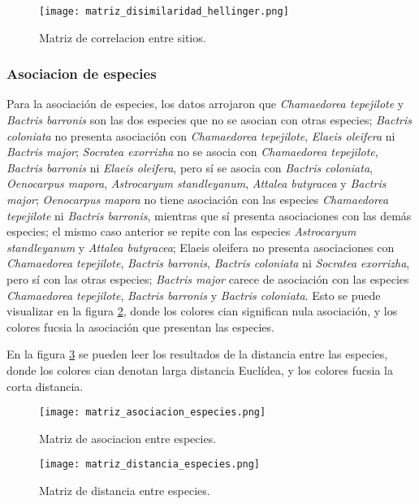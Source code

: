 \documentclass[11pt,]{article}
\begin{document}
\begin{figure}
\centering
\texttt{[image: matriz\_disimilaridad\_hellinger.png]}
\caption{Matriz de correlacion entre sitios.
\label{fig:matriz_disimilaridad_hellinger}}
\end{figure}

\subsubsection{Asociacion de especies}\label{asociacion-de-especies}

Para la asociación de especies, los datos arrojaron que
\emph{Chamaedorea tepejilote} y \emph{Bactris barronis} son las dos
especies que no se asocian con otras especies; \emph{Bactris coloniata}
no presenta asociación con \emph{Chamaedorea tepejilote}, \emph{Elaeis
oleifera} ni \emph{Bactris major}; \emph{Socratea exorrizha} no se
asocia con \emph{Chamaedorea tepejilote}, \emph{Bactris barronis} ni
\emph{Elaeis oleifera}, pero sí se asocia con \emph{Bactris coloniata},
\emph{Oenocarpus mapora}, \emph{Astrocaryum standleyanum}, \emph{Attalea
butyracea} y \emph{Bactris major}; \emph{Oenocarpus mapora} no tiene
asociación con las especies \emph{Chamaedorea tepejilote} ni
\emph{Bactris barronis}, mientras que sí presenta asociaciones con las
demás especies; el mismo caso anterior se repite con las especies
\emph{Astrocaryum standleyanum} y \emph{Attalea butyracea}; Elaeis
oleifera no presenta asociaciones con \emph{Chamaedorea tepejilote},
\emph{Bactris barronis}, \emph{Bactris coloniata} ni \emph{Socratea
exorrizha}, pero sí con las otras especies; \emph{Bactris major} carece
de asociación con las especies \emph{Chamaedorea tepejilote},
\emph{Bactris barronis} y \emph{Bactris coloniata}. Esto se puede
visualizar en la figura \ref{fig:matriz_asociacion_especies}, donde los
colores cian significan nula asociación, y los colores fucsia la
asociación que presentan las especies.

En la figura \ref{fig:matriz_distancia_especies} se pueden leer los
resultados de la distancia entre las especies, donde los colores cian
denotan larga distancia Euclídea, y los colores fucsia la corta
distancia.

\begin{figure}
\centering
\texttt{[image: matriz\_asociacion\_especies.png]}
\caption{Matriz de asociacion entre especies.
\label{fig:matriz_asociacion_especies}}
\end{figure}

\begin{figure}
\centering
\texttt{[image: matriz\_distancia\_especies.png]}
\caption{Matriz de distancia entre especies.
\label{fig:matriz_distancia_especies}}
\end{figure}
\end{document}
